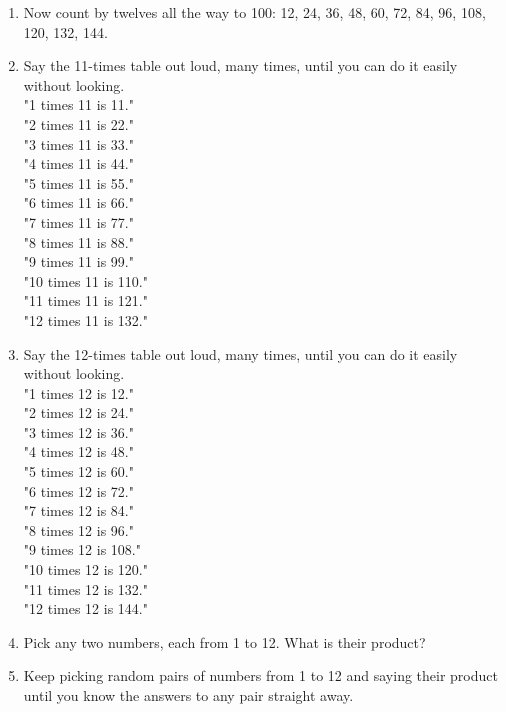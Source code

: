 \documentclass[12pt]{article}
\begin{document}
\begin{enumerate}
\item Now count by twelves all the way to 100:
12, 24, 36, 48, 60, 72, 84, 96, 108, 120, 132, 144.\\

\item Say the 11-times table out loud, many times, until you can do it easily without looking.\\

"1 times 11 is 11."\\
"2 times 11 is 22."\\
"3 times 11 is 33."\\
"4 times 11 is 44."\\
"5 times 11 is 55."\\
"6 times 11 is 66."\\
"7 times 11 is 77."\\
"8 times 11 is 88."\\
"9 times 11 is 99."\\
"10 times 11 is 110."\\
"11 times 11 is 121."\\
"12 times 11 is 132."\\

\item Say the 12-times table out loud, many times, until you can do it easily without looking.\\

"1 times 12 is 12."\\
"2 times 12 is 24."\\
"3 times 12 is 36."\\
"4 times 12 is 48."\\
"5 times 12 is 60."\\
"6 times 12 is 72."\\
"7 times 12 is 84."\\
"8 times 12 is 96."\\
"9 times 12 is 108."\\
"10 times 12 is 120."\\
"11 times 12 is 132."\\
"12 times 12 is 144."\\

\item Pick any two numbers, each  from 1 to 12. What is their product?
\item Keep picking random pairs of numbers from 1 to 12 and saying their product until you know the answers to any pair straight away.

\newpage


\end{enumerate}
\end{document}
